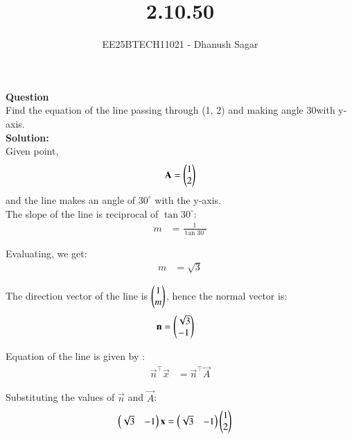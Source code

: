 \documentclass[journal]{IEEEtran}
\begin{document}



\title{2.10.50}
\author{EE25BTECH11021 - Dhanush Sagar
}
{\let\newpage\relax\maketitle}

\renewcommand{\thefigure}{\theenumi}
\renewcommand{\thetable}{\theenumi}
\setlength{\intextsep}{10pt} %
\renewcommand{\thetable}{\theenumi}
\textbf{Question} \\
Find the equation of the line passing through (1, 2) and making angle 30\degree with y-axis.\\

\textbf{Solution:} \\[6pt]
Given point,
\begin{align}
 \mathbf{A} = \begin{pmatrix}1 \\ 2\end{pmatrix}
\end{align}
and the line makes an angle of $30^\circ$ with the y-axis. \\[6pt]

The slope of the line is reciprocal of $\tan 30^\circ$:  
\begin{align}
m &= \frac{1}{\tan 30^\circ}
\end{align}

Evaluating, we get:  
\begin{align}
m &= \sqrt{3}
\end{align}

The direction vector of the line is $\begin{pmatrix}1 \\ m\end{pmatrix}$, hence the normal vector is:  
\begin{align}
\Vec{n} &= \myvec{\sqrt{3} \\ -1}
\end{align}

Equation of the line is given by :  
\begin{align}
\Vec{n}^\top \vec{x} &=\Vec{n}^\top \vec{A}
\end{align}

Substituting the values of $\vec{n}$ and $\vec{A}$:  
\begin{align}
\begin{pmatrix}\sqrt{3} & -1\end{pmatrix} \mathbf{x} &= \begin{pmatrix}\sqrt{3} & -1\end{pmatrix}\begin{pmatrix}1 \\ 2\end{pmatrix}
\end{align}
\end{document}
